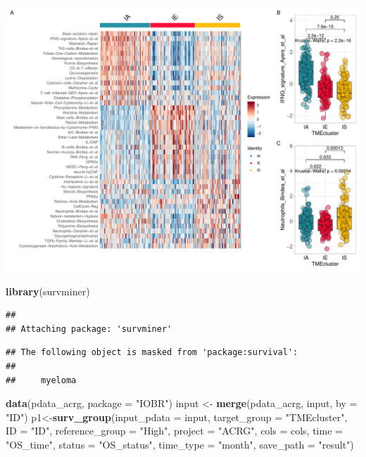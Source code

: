 \documentclass[
  12pt,
]{book}
\newenvironment{Shaded}{\begin{snugshade}}{\end{snugshade}}
\newcommand{\AttributeTok}[1]{\textcolor[rgb]{0.13,0.29,0.53}{#1}}
\newcommand{\FunctionTok}[1]{\textcolor[rgb]{0.13,0.29,0.53}{\textbf{#1}}}
\newcommand{\NormalTok}[1]{#1}
\newcommand{\OtherTok}[1]{\textcolor[rgb]{0.56,0.35,0.01}{#1}}
\newcommand{\StringTok}[1]{\textcolor[rgb]{0.31,0.60,0.02}{#1}}
\theoremstyle{definition}
\theoremstyle{definition}
\theoremstyle{definition}
\theoremstyle{definition}
\theoremstyle{remark}
\begin{document}
\includegraphics{_main_files/figure-latex/unnamed-chunk-29-1.pdf}

\begin{Shaded}
\begin{Highlighting}[]
\FunctionTok{library}\NormalTok{(survminer)}
\end{Highlighting}
\end{Shaded}

\begin{verbatim}
## 
## Attaching package: 'survminer'
\end{verbatim}

\begin{verbatim}
## The following object is masked from 'package:survival':
## 
##     myeloma
\end{verbatim}

\begin{Shaded}
\begin{Highlighting}[]
\FunctionTok{data}\NormalTok{(pdata\_acrg, }\AttributeTok{package =} \StringTok{"IOBR"}\NormalTok{)}
\NormalTok{input }\OtherTok{\textless{}{-}} \FunctionTok{merge}\NormalTok{(pdata\_acrg, input, }\AttributeTok{by =} \StringTok{"ID"}\NormalTok{)}
\NormalTok{p1}\OtherTok{\textless{}{-}}\FunctionTok{surv\_group}\NormalTok{(}\AttributeTok{input\_pdata       =}\NormalTok{ input,}
               \AttributeTok{target\_group      =} \StringTok{"TMEcluster"}\NormalTok{,}
               \AttributeTok{ID                =} \StringTok{"ID"}\NormalTok{,}
               \AttributeTok{reference\_group   =} \StringTok{"High"}\NormalTok{,}
               \AttributeTok{project           =} \StringTok{"ACRG"}\NormalTok{,}
               \AttributeTok{cols              =}\NormalTok{ cols, }
               \AttributeTok{time              =} \StringTok{"OS\_time"}\NormalTok{,}
               \AttributeTok{status            =} \StringTok{"OS\_status"}\NormalTok{,}
               \AttributeTok{time\_type         =} \StringTok{"month"}\NormalTok{,}
               \AttributeTok{save\_path         =} \StringTok{"result"}\NormalTok{)}
\end{Highlighting}
\end{Shaded}
\end{document}
